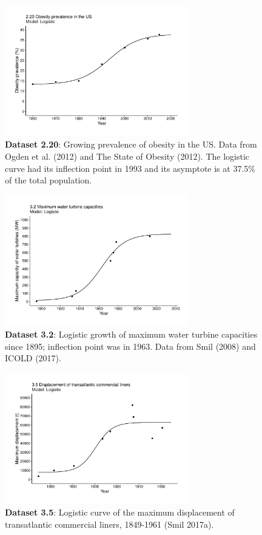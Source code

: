 \documentclass[aps,rmp,preprint,superscriptaddress,10pt,onecolumn]{article}
\begin{document}
\begin{figure}[h]
\includegraphics[width=8cm]{output/figs-ggplot/2.20.pdf}
\caption{\textbf{Dataset 2.20}: Growing prevalence of obesity in the US. Data from Ogden et al. (2012) and The State of Obesity (2012). The logistic curve had its inflection point in 1993 and its asymptote is at 37.5\% of the total population.}
\end{figure}
	
\begin{figure}[h]
\includegraphics[width=8cm]{output/figs-ggplot/3.2.pdf}
\caption{\textbf{Dataset 3.2}: Logistic growth of maximum water turbine capacities since 1895; inflection point was in 1963. Data from Smil (2008) and ICOLD (2017).}
\end{figure}
	
\begin{figure}[h]
\includegraphics[width=8cm]{output/figs-ggplot/3.5.pdf}
\caption{\textbf{Dataset 3.5}: Logistic curve of the maximum displacement of transatlantic commercial liners, 1849-1961 (Smil 2017a).}
\end{figure}
	
\end{document}
